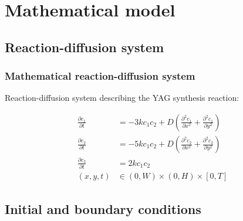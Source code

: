 \documentclass{beamer}
\begin{document}
\section{Mathematical model}

\subsection{Reaction-diffusion system}

\begin{frame}
  \frametitle{Mathematical reaction-diffusion system}

  Reaction-diffusion system describing the YAG synthesis reaction:
  
  \begin{align*}
    \frac{\partial c_1}{\partial t} & =-3kc_1c_2+D\left(\frac{\partial^2c_1}{\partial x^2}+\frac{\partial^2c_1}{\partial y^2}\right) \\
    \frac{\partial c_2}{\partial t} & =-5kc_1c_2+D\left(\frac{\partial^2c_2}{\partial x^2}+\frac{\partial^2c_2}{\partial y^2}\right)\\
    \frac{\partial c_3}{\partial t} & =2kc_1c_2\\
    (x, y, t)&\in(0, W)\times(0, H)\times[0, T]
  \end{align*}

\end{frame}

\subsection{Initial and boundary conditions}
\end{document}
